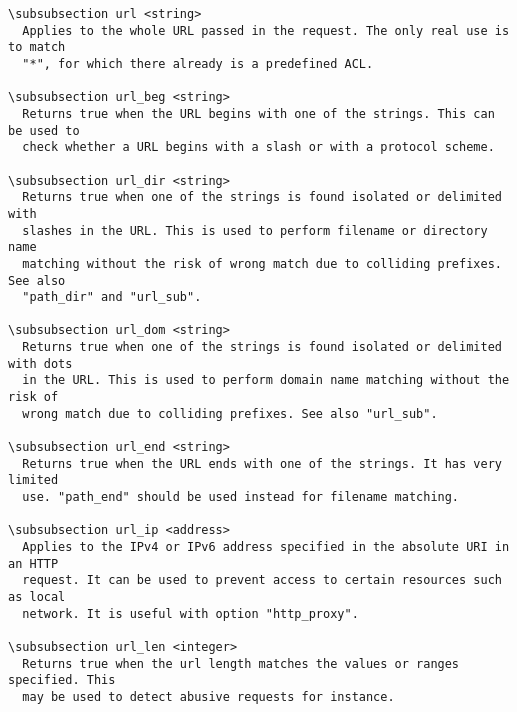 \begin{verbatim}
\subsubsection url <string>
  Applies to the whole URL passed in the request. The only real use is to match
  "*", for which there already is a predefined ACL.

\subsubsection url_beg <string>
  Returns true when the URL begins with one of the strings. This can be used to
  check whether a URL begins with a slash or with a protocol scheme.

\subsubsection url_dir <string>
  Returns true when one of the strings is found isolated or delimited with
  slashes in the URL. This is used to perform filename or directory name
  matching without the risk of wrong match due to colliding prefixes. See also
  "path_dir" and "url_sub".

\subsubsection url_dom <string>
  Returns true when one of the strings is found isolated or delimited with dots
  in the URL. This is used to perform domain name matching without the risk of
  wrong match due to colliding prefixes. See also "url_sub".

\subsubsection url_end <string>
  Returns true when the URL ends with one of the strings. It has very limited
  use. "path_end" should be used instead for filename matching.

\subsubsection url_ip <address>
  Applies to the IPv4 or IPv6 address specified in the absolute URI in an HTTP
  request. It can be used to prevent access to certain resources such as local
  network. It is useful with option "http_proxy".

\subsubsection url_len <integer>
  Returns true when the url length matches the values or ranges specified. This
  may be used to detect abusive requests for instance.


\end{verbatim}
